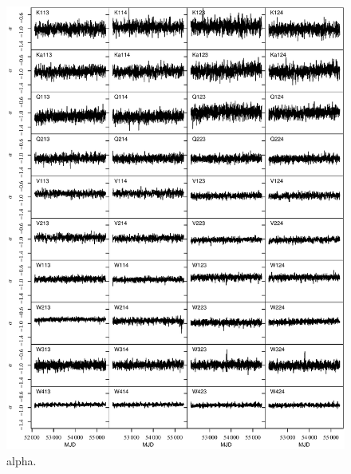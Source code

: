 \documentclass[twocolumn]{../../common/aa}
\begin{document}
\begin{figure}[p]
  	\centering
	\includegraphics[width=\textwidth]{figures/instpar_CG_alpha_v1.pdf}
	\caption{alpha.}
	\label{fig:alpha}
\end{figure}
\end{document}
